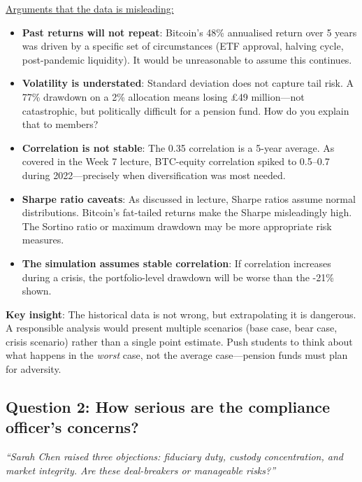 \documentclass[11pt]{article}
\begin{document}
\medskip
\noindent\underline{Arguments that the data is misleading:}
\begin{itemize}[leftmargin=*]
\item \textbf{Past returns will not repeat}: Bitcoin's 48\% annualised return over 5 years was driven by a specific set of circumstances (ETF approval, halving cycle, post-pandemic liquidity). It would be unreasonable to assume this continues.
\item \textbf{Volatility is understated}: Standard deviation does not capture tail risk. A 77\% drawdown on a 2\% allocation means losing \pounds 49 million---not catastrophic, but politically difficult for a pension fund. How do you explain that to members?
\item \textbf{Correlation is not stable}: The 0.35 correlation is a 5-year average. As covered in the Week 7 lecture, BTC-equity correlation spiked to 0.5--0.7 during 2022---precisely when diversification was most needed.
\item \textbf{Sharpe ratio caveats}: As discussed in lecture, Sharpe ratios assume normal distributions. Bitcoin's fat-tailed returns make the Sharpe misleadingly high. The Sortino ratio or maximum drawdown may be more appropriate risk measures.
\item \textbf{The simulation assumes stable correlation}: If correlation increases during a crisis, the portfolio-level drawdown will be worse than the -21\% shown.
\end{itemize}

\medskip
\noindent\textbf{Key insight}: The historical data is not wrong, but extrapolating it is dangerous. A responsible analysis would present multiple scenarios (base case, bear case, crisis scenario) rather than a single point estimate. Push students to think about what happens in the \textit{worst} case, not the average case---pension funds must plan for adversity.

\subsection*{Question 2: How serious are the compliance officer's concerns?}

\textit{``Sarah Chen raised three objections: fiduciary duty, custody concentration, and market integrity. Are these deal-breakers or manageable risks?''}
\end{document}
